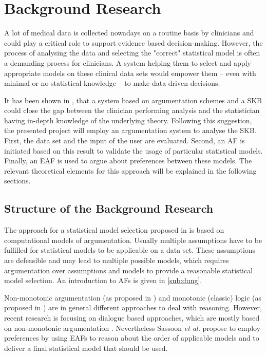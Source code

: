 \section{Background Research}
\label{sec:background}

A lot of medical data is collected nowadays on a routine basis by clinicians and could play a critical role to support evidence based decision-making. However, the process of analysing the data and selecting the "correct" statistical model is often a demanding process for clinicians. A system helping them to select and apply appropriate models on these clinical data sets would empower them -- even with minimal or no statistical knowledge -- to make data driven decisions. 

It has been shown in \cite{sassoon2014}, that a system based on argumentation schemes and a \gls{SKB} could close the gap between the clinician performing analysis and the statistician having in-depth knowledge of the underlying theory. Following this suggestion, the presented project will employ an argumentation system to analyse the \gls{SKB}. First, the data set and the input of the user are evaluated. Second, an \gls{AF} is initiated based on this result to validate the usage of particular statistical models. Finally, an \gls{EAF} is used to argue about preferences between these models. The relevant theoretical elements for this approach will be explained in the following sections.


\subsection{Structure of the Background Research}

The approach for a statistical model selection proposed in \cite{sassoon2014} is based on computational models of argumentation. Usually multiple assumptions have to be fulfilled for statistical models to be applicable on a data set. These assumptions are defeasible and may lead to multiple possible models, which requires argumentation over assumptions and models to provide a reasonable statistical model selection. An introduction to \glspl{AF} is given in \autoref{sub:dung}. 

Non-monotonic argumentation (as proposed in \cite{dung1995,liao}) and monotonic (classic) logic (as proposed in \cite{Reiter1980}) are in general different approaches to deal with reasoning. However, recent research is focusing on dialogue based approaches, which are mostly based on non-monotonic argumentation \cite{parsons2000,Walton1995}. 
Nevertheless Sassoon \textit{et al.} propose to employ preferences by using \glspl{EAF} to reason about the order of applicable models and to deliver a final statistical model that should be used. 

